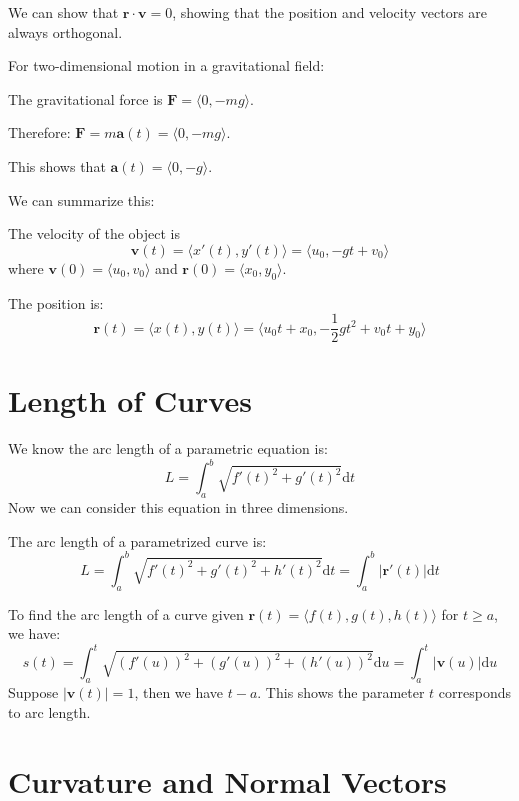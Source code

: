 \documentclass[../calc3.tex]{subfiles}
\begin{document}
We can show that $\textbf{r}\cdot\textbf{v}=0$, showing that the position and velocity vectors are always orthogonal.

For two-dimensional motion in a gravitational field:

The gravitational force is $\textbf{F}=\langle 0, -mg\rangle$.

Therefore: $\textbf{F}=m\textbf{a}(t)=\langle 0,-mg\rangle$.

This shows that $\textbf{a}(t)=\langle 0,-g\rangle$.

We can summarize this:

The velocity of the object is 
\[\textbf{v}(t)=\langle x'(t),y'(t)\rangle =\langle u_0,-gt+v_0\rangle\]
where $\textbf{v}(0)=\langle u_0,v_0\rangle$ and $\textbf{r}(0)=\langle x_0,y_0\rangle$.

The position is:
\[\textbf{r}(t)=\langle x(t),y(t)\rangle=\langle u_0t+x_0,-\frac{1}{2}gt^2+v_0t+y_0\rangle\] 

\section{Length of Curves}
We know the arc length of a parametric equation is:
\[L=\int_a^b\sqrt{f'(t)^2+g'(t)^2}\mathrm{d}t\]
Now we can consider this equation in three dimensions.

The arc length of a parametrized curve is:
\[L=\int_a^b\sqrt{f'(t)^2+g'(t)^2+h'(t)^2}\mathrm{d}t=\int_a^b|\textbf{r}'(t)|\mathrm{d}t\] 

To find the arc length of a curve given $\textbf{r}(t)=\langle f(t),g(t),h(t)\rangle$ for $t\geq a$, we have:
\[s(t)=\int_a^t\sqrt{(f'(u))^2+(g'(u))^2+(h'(u))^2}\mathrm{d}u=\int_a^t |\textbf{v}(u)|\mathrm{d}u\] 
Suppose $|\textbf{v}(t)| = 1$, then we have $t-a$. This shows the parameter $t$ corresponds to arc length.


\section{Curvature and Normal Vectors}
\end{document}
